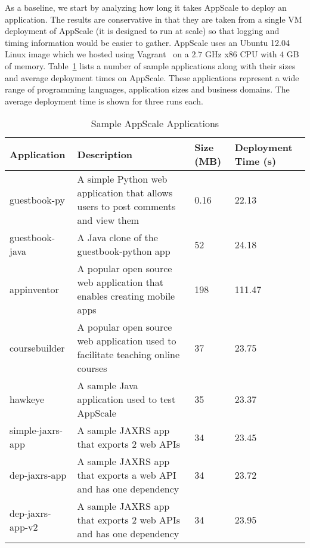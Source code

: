 

As a baseline, we start by analyzing how long it takes AppScale to deploy an
application.  The results are conservative in that they are taken from a
single VM deployment of AppScale (it is designed to run at scale) so that
logging and timing information would be easier to gather.  AppScale uses an
Ubuntu 12.04 Linux image which we hosted using Vagrant~\cite{vagrant}    
on a $2.7$ GHz x86 CPU with $4$ GB of memory.
Table~\ref{tab:sample_apps} lists a number of sample
applications along with their sizes and average deployment times on AppScale.
These applications represent a wide range of programming languages,
application sizes and business domains. The average deployment time is shown
for three runs each.

\begin{table}[ht]
\begin{center}
\begin{tabular}{| p{1.5cm} | p{3cm} | p{0.5cm} | p{1.1cm} | }
\hline
Application & Description & Size (MB) & Deployment Time (s) \\ \hline
guestbook-py & A simple Python web application that allows users to post
comments and view them & 0.16 & 22.13 \\ \hline
guestbook-java & A Java clone of the guestbook-python app & 52 & 24.18 \\ \hline
appinventor & A popular open source web application that enables creating mobile apps & 198 & 111.47 \\ \hline
coursebuilder & A popular open source web application used to facilitate teaching online courses & 37 & 23.75 \\ \hline
hawkeye & A sample Java application used to test AppScale & 35 & 23.37 \\ \hline
simple-jaxrs-app & A sample JAXRS app that exports 2 web APIs & 34 & 23.45 \\ \hline
dep-jaxrs-app & A sample JAXRS app that exports a web API and has one dependency & 34 & 23.72 \\ \hline
dep-jaxrs-app-v2 & A sample JAXRS app that exports 2 web APIs and has one dependency & 34 & 23.95 \\ \hline
\end{tabular}
\end{center}
\caption{Sample AppScale Applications}
\label{tab:sample_apps}
\end{table}

